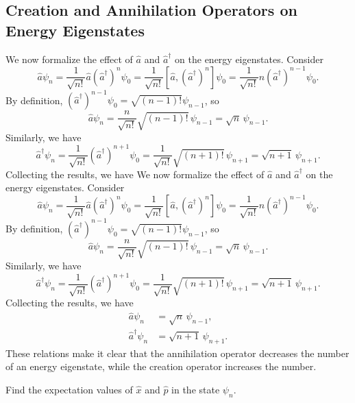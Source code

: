 \subsection{Creation and Annihilation Operators on Energy Eigenstates}\label{creation_annihilation_operators}

We now formalize the effect of $\hat{a}$ and $\hat{a}^\dagger$ on the energy eigenstates. Consider $$\hat{a}\psi_n=\frac{1}{\sqrt{n!}}\hat{a}(\hat{a}^\dagger)^n\psi_0=\frac{1}{\sqrt{n!}}[\hat{a},(\hat{a}^\dagger)^n]\psi_0=\frac{1}{\sqrt{n!}}n(\hat{a}^\dagger)^{n-1}\psi_0.$$By definition, $(\hat{a}^\dagger)^{n-1}\psi_0=\sqrt{(n-1)!}\psi_{n-1}$, so $$\hat{a}\psi_n=\frac{n}{\sqrt{n!}}\sqrt{(n-1)!}\,\psi_{n-1}=\sqrt{n}\,\psi_{n-1}.$$Similarly, we have $$\hat{a}^\dagger\psi_n=\frac{1}{\sqrt{n!}}(\hat{a}^\dagger)^{n+1}\psi_0=\frac{1}{\sqrt{n!}}\sqrt{(n+1)!}\,\psi_{n+1}=\sqrt{n+1}\,\psi_{n+1}.$$Collecting the results, we have We now formalize the effect of $\hat{a}$ and $\hat{a}^\dagger$ on the energy eigenstates. Consider $$\hat{a}\psi_n=\frac{1}{\sqrt{n!}}\hat{a}(\hat{a}^\dagger)^n\psi_0=\frac{1}{\sqrt{n!}}[\hat{a},(\hat{a}^\dagger)^n]\psi_0=\frac{1}{\sqrt{n!}}n(\hat{a}^\dagger)^{n-1}\psi_0.$$By definition, $(\hat{a}^\dagger)^{n-1}\psi_0=\sqrt{(n-1)!}\psi_{n-1}$, so $$\hat{a}\psi_n=\frac{n}{\sqrt{n!}}\sqrt{(n-1)!}\,\psi_{n-1}=\sqrt{n}\,\psi_{n-1}.$$Similarly, we have $$\hat{a}^\dagger\psi_n=\frac{1}{\sqrt{n!}}(\hat{a}^\dagger)^{n+1}\psi_0=\frac{1}{\sqrt{n!}}\sqrt{(n+1)!}\,\psi_{n+1}=\sqrt{n+1}\,\psi_{n+1}.$$Collecting the results, we have
\begin{align*}
\hat{a}\psi_n&=\sqrt{n}\,\psi_{n-1},\\ \hat{a}^\dagger\psi_n &= \sqrt{n+1}\,\psi_{n+1}.
\end{align*}
These relations make it clear that the annihilation operator decreases the number of an energy eigenstate, while the creation operator increases the number.

\begin{framedexpl}
    Find the expectation values of $\hat{x}$ and $\hat{p}$ in the state $\psi_n$.
\end{framedexpl}

